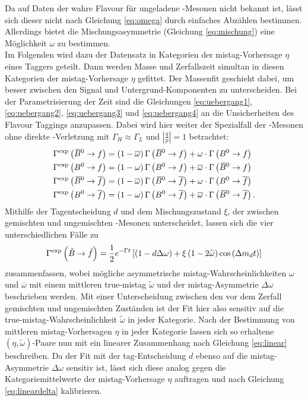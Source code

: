 Da auf Daten der wahre Flavour für ungeladene \B-Mesonen nicht bekannt ist, lässt sich dieser nicht nach Gleichung \eqref{eq:omega} durch einfaches Abzählen bestimmen. Allerdings bietet die Mischungsasymmetrie (Gleichung \eqref{eq:mischung}) eine Möglichkeit $\omega$ zu bestimmen.\\ 
Im Folgenden wird dazu der Datensatz in Kategorien der mistag-Vorhersage $\eta$ eines Taggers geteilt. Dann werden Masse und Zerfallszeit simultan in diesen Kategorien der mistag-Vorhersage $\eta$ gefittet. Der Massenfit geschieht dabei, um besser zwischen den Signal und Untergrund-Komponenten zu unterscheiden. Bei der Parametrisierung der Zeit sind die Gleichungen \eqref{eq:uebergang1}, \eqref{eq:uebergang2}, \eqref{eq:uebergang3} und \eqref{eq:uebergang4} an die Unsicherheiten des Flavour Taggings anzupassen. Dabei wird hier weiter der Spezialfall der \Bz-Mesonen ohne direkte \CP-Verletzung mit $\Gamma_H\approx\Gamma_L$ und $\left|\tfrac{q}{p}\right|=1$ betrachtet:
\begin{equation}
\begin{split}
\Gamma^\text{exp}\left({{\kern 0.18em\overline{\kern -0.18em B}{}}{}^0}\rightarrow f\right)&=\left(1-\overline{\omega}\right)\Gamma\left({{\kern 0.18em\overline{\kern -0.18em B}{}}{}^0}\rightarrow f\right)+\omega\cdot\Gamma\left({{B}^0}\rightarrow f\right)\\
\Gamma^\text{exp}\left({{B}^0}\rightarrow f\right)&=\left(1-\omega\right)\Gamma\left({{B}^0}\rightarrow f\right)+\overline{\omega}\cdot\Gamma\left({{\kern 0.18em\overline{\kern -0.18em B}{}}{}^0}\rightarrow f\right)\\
\Gamma^\text{exp}\left({{\kern 0.18em\overline{\kern -0.18em B}{}}{}^0}\rightarrow\overline{f}\right)&=\left(1-\overline{\omega}\right)\Gamma\left({{\kern 0.18em\overline{\kern -0.18em B}{}}{}^0}\rightarrow\overline{f}\right)+\omega\cdot\Gamma\left({{B}^0}\rightarrow\overline{f}\right)\\
\Gamma^\text{exp}\left({{B}^0}\rightarrow\overline{f}\right)&=\left(1-\omega\right)\Gamma\left({{B}^0}\rightarrow\overline{f}\right)+\overline{\omega}\cdot\Gamma\left({{\kern 0.18em\overline{\kern -0.18em B}{}}{}^0}\rightarrow\overline{f}\right).
\end{split}
\end{equation}
Mithilfe der Tagentscheidung $d$ und dem Mischungszustand $\xi$, der zwischen gemischten und ungemischten \B-Mesonen unterscheidet, lassen sich die vier unterschiedlichen Fälle zu
\begin{equation}
\Gamma^\text{exp}\left(\hat{B}\rightarrow\hat{f}\right)=\frac{1}{2}e^{-\Gamma t}\left[\left(1-d\Delta\omega\right)+\xi\left(1-2\widetilde{\omega}\right)\cos\left({\Delta m_{{d}}} t\right)\right]
\end{equation}
zusammenfassen, wobei mögliche asymmetrische mistag-Wahrscheinlichkeiten $\omega$ und $\overline{\omega}$ mit einem mittleren true-mistag $\widetilde{\omega}$ und der mistag-Asymmetrie $\Delta\omega$ beschrieben werden. Mit einer Unterscheidung zwischen den vor dem Zerfall gemischten und ungemischten Zuständen ist der Fit hier also sensitiv auf die true-mistag-Wahrscheinlichkeit $\widetilde{\omega}$ in jeder Kategorie. Nach der Bestimmung von mittleren mistag-Vorhersagen $\eta$ in jeder Kategorie lassen sich so erhaltene $(\eta,\widetilde{\omega})$-Paare nun mit ein linearer Zusammenhang nach Gleichung \eqref{eq:linear} beschreiben. Da der Fit mit der tag-Entscheidung $d$ ebenso auf die mistag-Asymmetrie $\Delta \omega$ sensitiv ist, lässt sich diese analog gegen die Kategoriemittelwerte der mistag-Vorhersage $\eta$ auftragen und nach Gleichung \eqref{eq:lineardelta} kalibrieren.\\

